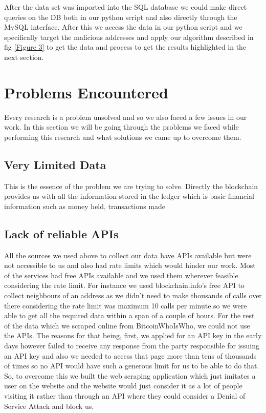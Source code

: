 \documentclass{article}
\begin{document}
        After the data set was imported into the SQL database we could make direct queries on the DB both in our python script and also directly through the MySQL interface. After this we access the data in our python script and we specifically target the malicious addresses and apply our algorithm described in fig \ref{Figure 3} to get the data and process to get the results highlighted in the next section.
        
    
\pagebreak


\section{Problems Encountered}
    
    Every research is a problem unsolved and so we also faced a few issues in our work. In this section we will be going through the problems we faced while performing this research and what solutions we came up to overcome them. 
    
    \subsection{Very Limited Data} 
    
        This is the essence of the problem we are trying to solve. Directly the blockchain provides us with all the information stored in the ledger which is basic financial information such as money held, transactions made 
        
    \subsection{Lack of reliable APIs}
    
        All the sources we used above to collect our data have APIs available but were not accessible to us and also had rate limits which would hinder our work. Most of the services had free APIs available and we used them wherever feasible considering the rate limit. For instance we used blockchain.info's free API to collect neighbours of an address as we didn't need to make thousands of calls over there considering the rate limit was maximum 10 calls per minute so we were able to get all the required data within a span of a couple of hours. For the rest of the data which we scraped online from BitcoinWhoIsWho, we could not use the APIs. The reasons for that being, first, we applied for an API key in the early days however failed to receive any response from the party responsible for issuing an API key and also we needed to access that page more than tens of thousands of times so no API would have such a generous limit for us to be able to do that. So, to overcome this we built the web scraping application which just imitates a user on the website and the website would just consider it as a lot of people visiting it rather than through an API where they could consider a Denial of Service Attack and block us.
        
\end{document}
